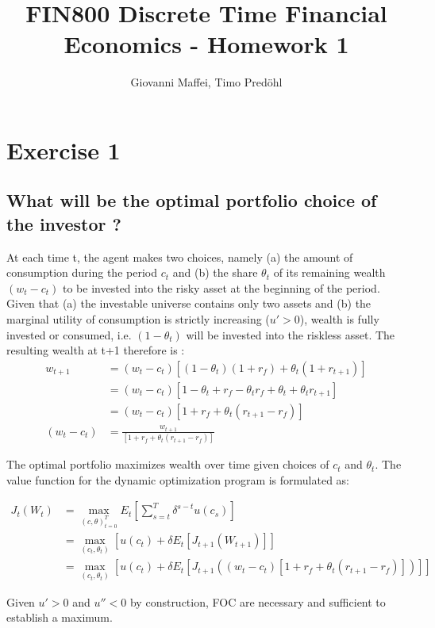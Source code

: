 \documentclass[]{article}
\title{FIN800 Discrete Time Financial Economics - Homework 1}
\author{Giovanni Maffei, Timo Predöhl}
\begin{document}
\maketitle

\section{Exercise 1}

\subsection{What will be the optimal portfolio choice of the investor ?}
At each time t, the agent makes two choices, namely (a) the amount of consumption during the period $c_t$ and (b) the share $\theta_t$ of its remaining wealth $(w_t - c_t)$ to be invested into the risky asset at the beginning of the period. Given that (a) the investable universe contains only two assets and (b) the marginal utility of consumption is strictly increasing ($u'>0$), wealth is fully invested or consumed, i.e. $(1-\theta_t)$ will be invested into the riskless asset. The resulting wealth at t+1 therefore is :
\begin{align*}
	w_{t+1} &= (w_t - c_t)\left[(1-\theta_t)(1+r_f)+ \theta_t(1+r_{t+1}) \right]\\
	&= (w_t - c_t) \left[1 -\theta_t + r_f - \theta_t r_f + \theta_t + \theta_t r_{t+1}\right]\\
	&= (w_t - c_t) \left[1 + r_f + \theta_t(r_{t+1}-r_f) \right]\\
	(w_t - c_t) &= \frac{w_{t+1}}{\left[1 + r_f + \theta_t(r_{t+1}-r_f) \right]}
\end{align*}



The optimal portfolio maximizes wealth over time given choices of $c_t$ and $\theta_t$. The value function for the dynamic optimization program is formulated as:

\begin{align*}
	J_t(W_t) &= \max_{(c, \theta)_{t=0}^T} E_t \left[\sum_{s=t}^{T} \delta^{s-t}u(c_s)\right]\\
	&= \max_{(c_t, \theta_t)} \left[u(c_t) + \delta E_t\left[J_{t+1}(W_{t+1})\right]\right]\\
	&= \max_{(c_t, \theta_t)} \left[u(c_t) + \delta E_t\left[J_{t+1}((w_t - c_t) \left[1 + r_f + \theta_t(r_{t+1}-r_f) \right])\right]\right]
\end{align*}

Given $u'>0$ and $u''<0$ by construction, FOC are necessary and sufficient to establish a maximum.
\end{document}
